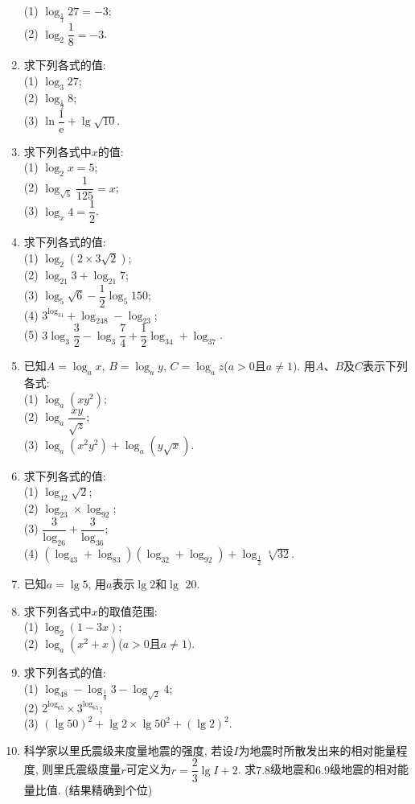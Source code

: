 \documentclass[10pt,a4paper]{article}
\begin{document}
\begin{enumerate}[1.]
(1) $\log_{\frac 13}27=-3$;\\
(2) $\log_2\dfrac 18=-3$.
\item 求下列各式的值:\\
(1) $\log_3 27$;\\
(2) $\log_{\frac 12}8$;\\
(3) $\ln \dfrac 1{\mathrm{e}}+\lg \sqrt {10}$.
\item 求下列各式中$x$的值:\\
(1) $\log_2x=5$;\\
(2) $\log_{\sqrt 5}\dfrac1{125}=x$;\\
(3) $\log_x4=\dfrac 12$.
\item 求下列各式的值:\\
(1) $\log_2(2\times 3\sqrt 2)$;\\
(2) $\log_{21}3+\log_{21}7$;\\
(3) $\log_5\sqrt 6-\dfrac 12\log_5 150$;\\
(4) $3^{\log_31}+\log_248-\log_23$;\\
(5) $3\log_3\dfrac 32-\log_3\dfrac 74+\dfrac 12\log_34+\log_37$.
\item 已知$A=\log_ax$, $B=\log_ay$, $C=\log_az$($a>0$且$a\ne 1)$. 用$A$、$B$及$C$表示下列各式:\\
(1) $\log_a(xy^2)$;\\
(2) $\log_a\dfrac{xy}{\sqrt z}$;\\
(3) $\log_a(x^2y^2)+\log_a(y\sqrt x)$.
\item 求下列各式的值:\\
(1) $\log_42\sqrt 2$;\\
(2) $\log_23\times \log_92$;\\
(3) $\dfrac 3{\log_26}+\dfrac 3{\log_36}$;\\
(4) $(\log_43+\log_83)(\log_32+\log_92)+\log_{\frac 12}\sqrt[4]{32}$.
\item 已知$a=\lg 5$, 用$a$表示$\lg 2$和$\lg$ $20$.
\item 求下列各式中$x$的取值范围:\\
(1) $\log_2(1-3x)$;\\
(2) $\log_a(x^2+x)$($a>0$且$a\ne 1)$.
\item 求下列各式的值:\\
(1) $\log_48-\log_{\frac 19}3-\log_{\sqrt 2}4$;\\
(2) $2^{\log_65}\times 3^{\log_65}$;\\
(3) $(\lg 50)^2+\lg 2\times \lg 50^2+(\lg 2)^2$.
\item 科学家以里氏震级来度量地震的强度, 若设$I$为地震时所散发出来的相对能量程度, 则里氏震级度量$r$可定义为$r=\dfrac 23\lg I+2$. 求$7.8$级地震和$6. 9$级地震的相对能量比值. (结果精确到个位)

\end{enumerate}
\end{document}
